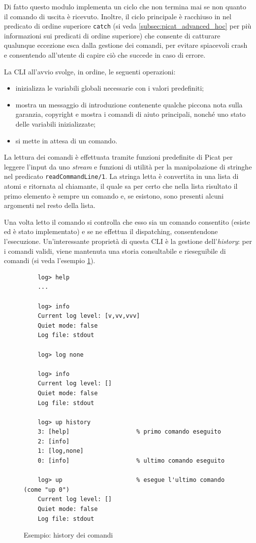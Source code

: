 \documentclass[12pt,a4paper,openright]{book}  %
\begin{document}
Di fatto questo modulo implementa un ciclo che non termina mai se non
quanto il comando di uscita è ricevuto. Inoltre, il ciclo principale è
racchiuso in nel predicato di ordine superiore \texttt{catch} (si veda
\ref{subsec:picat_advanced_hoc} per più informazioni sui predicati di
ordine superiore) che consente di catturare qualunque eccezione esca
dalla gestione dei comandi, per evitare spiacevoli crash e consentendo
all'utente di capire ciò che succede in caso di errore.

La CLI all'avvio svolge, in ordine, le seguenti operazioni:
\begin{itemize}
	\item inizializza le variabili globali necessarie con i valori
          predefiniti;
	\item mostra un messaggio di introduzione contenente qualche
          piccona nota sulla garanzia, copyright e mostra i comandi di
          aiuto principali, nonché uno stato delle variabili
          inizializzate;
	\item si mette in attesa di un comando.
\end{itemize}

La lettura dei comandi è effettuata tramite funzioni predefinite di
Picat per leggere l'input da uno \emph{stream} e funzioni di utilità
per la manipolazione di stringhe nel predicato
\texttt{readCommandLine/1}. La stringa letta è convertita in una lista
di atomi e ritornata al chiamante, il quale sa per certo che nella
lista risultato il primo elemento è sempre un comando e, se esistono,
sono presenti alcuni argomenti nel resto della lista.

Una volta letto il comando si controlla che esso sia un comando
consentito (esiste ed è stato implementato) e se ne effettua il
dispatching, consentendone l'esecuzione. Un'interessante proprietà di
questa CLI è la gestione dell'\textit{history}: per i comandi validi,
viene mantenuta una storia consultabile e rieseguibile di comandi (si
veda l'esempio \ref{fig:example_commandshistory}).

\begin{figure}
	\begin{verbatim}
	log> help
	...

	log> info
	Current log level: [v,vv,vvv]
	Quiet mode: false
	Log file: stdout

	log> log none

	log> info
	Current log level: []
	Quiet mode: false
	Log file: stdout

	log> up history
	3: [help]                   % primo comando eseguito
	2: [info]
	1: [log,none]
	0: [info]                   % ultimo comando eseguito

	log> up                     % esegue l'ultimo comando (come "up 0")
	Current log level: []
	Quiet mode: false
	Log file: stdout
	\end{verbatim}
	\caption{Esempio: history dei comandi}
	\label{fig:example_commandshistory}
\end{figure}
\end{document}
